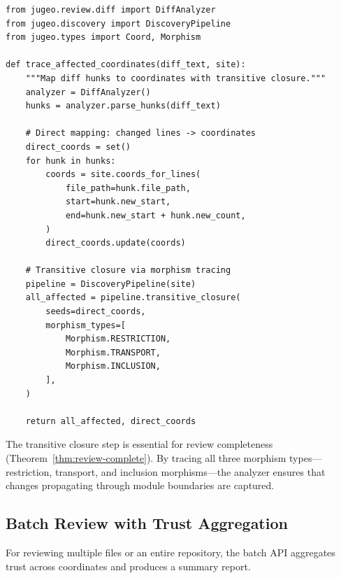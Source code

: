 \documentclass[11pt]{article}
\begin{document}
\begin{lstlisting}[style=jugeo-python]
from jugeo.review.diff import DiffAnalyzer
from jugeo.discovery import DiscoveryPipeline
from jugeo.types import Coord, Morphism

def trace_affected_coordinates(diff_text, site):
    """Map diff hunks to coordinates with transitive closure."""
    analyzer = DiffAnalyzer()
    hunks = analyzer.parse_hunks(diff_text)

    # Direct mapping: changed lines -> coordinates
    direct_coords = set()
    for hunk in hunks:
        coords = site.coords_for_lines(
            file_path=hunk.file_path,
            start=hunk.new_start,
            end=hunk.new_start + hunk.new_count,
        )
        direct_coords.update(coords)

    # Transitive closure via morphism tracing
    pipeline = DiscoveryPipeline(site)
    all_affected = pipeline.transitive_closure(
        seeds=direct_coords,
        morphism_types=[
            Morphism.RESTRICTION,
            Morphism.TRANSPORT,
            Morphism.INCLUSION,
        ],
    )

    return all_affected, direct_coords
\end{lstlisting}

The transitive closure step is essential for review completeness
(Theorem~\ref{thm:review-complete}). By tracing all three morphism
types---\compMorphRestriction{} restriction, \compMorphTransport{}
transport, and \compMorphInclusion{} inclusion morphisms---the analyzer
ensures that changes propagating through module boundaries are captured.

\subsection{Batch Review with Trust Aggregation}

For reviewing multiple files or an entire repository, the batch API
aggregates trust across coordinates and produces a summary report.
\end{document}
